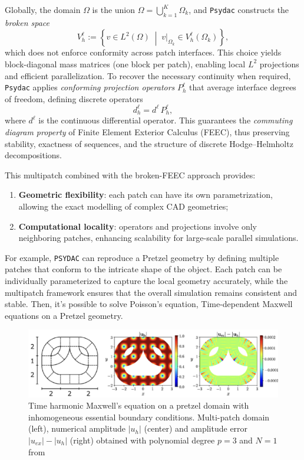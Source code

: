\documentclass[a4paper,12pt,twoside]{report}
\begin{document}
Globally, the domain $\Omega$ is the union $\Omega = \bigcup_{k=1}^K \Omega_k$, and \texttt{Psydac} constructs the \emph{broken space}
\[
V_h^\ell := \left\{ v \in L^2(\Omega) \; \middle| \; v|_{\Omega_k} \in V_h^\ell(\Omega_k) \right\},
\]
which does not enforce conformity across patch interfaces. This choice yields block-diagonal mass matrices (one block per patch), enabling local $L^2$ projections and efficient parallelization. To recover the necessary continuity when required, \texttt{Psydac} applies \emph{conforming projection operators} $P_h^\ell$ that average interface degrees of freedom, defining discrete operators
\[
d_h^\ell = d^\ell \, P_h^\ell,
\]
where $d^\ell$ is the continuous differential operator. This guarantees the \emph{commuting diagram property} of Finite Element Exterior Calculus (FEEC), thus preserving stability, exactness of sequences, and the structure of discrete Hodge--Helmholtz decompositions.

This multipatch combined with the broken-FEEC approach provides:
\begin{enumerate}
    \item \textbf{Geometric flexibility}: each patch can have its own parametrization, allowing the exact modelling of complex CAD geometries;
    \item \textbf{Computational locality}: operators and projections involve only neighboring patches, enhancing scalability for large-scale parallel simulations.
\end{enumerate}

For example, \texttt{PSYDAC} can reproduce a Pretzel geometry by defining multiple patches that conform to the intricate shape of the object. Each patch can be individually parameterized to capture the local geometry accurately, while the multipatch framework ensures that the overall simulation remains consistent and stable. Then, it's possible to solve Poisson's equation, Time-dependent Maxwell equations on a Pretzel geometry.
\newpage
\begin{figure}[!h]
	\centering
	\includegraphics[width=1\textwidth]{figures/maxwell_pretzel.png}
	\caption{Time harmonic Maxwell's equation on a pretzel domain with inhomogeneous essential boundary conditions. Multi-patch domain (left), numerical amplitude $|u_h|$ (center) and amplitude error $|u_{ex}| - |u_h|$ (right) obtained with polynomial degree $p = 3$ and $N = 1$ from \cite{guclu_psydac_2022}}
\end{figure}
\end{document}
